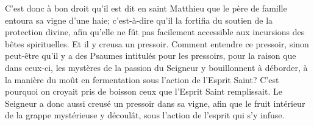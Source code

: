 C’est donc à bon droit qu’il est dit en saint Matthieu
	que le père de famille entoura sa vigne d’une haie;
	c’est-à-dire qu’il la fortifia du soutien de la protection divine,
	afin qu’elle ne fût pas facilement accessible
		aux incursions des bêtes spirituelles.
Et il y creusa un pressoir.
Comment entendre ce pressoir,
	sinon peut-être qu’il y a des Psaumes intitulés pour les pressoirs,
	pour la raison que dans ceux-ci,
	les mystères de la passion du Seigneur y bouillonnent à déborder,
	à la manière du moût en fermentation sous l’action de l’Esprit Saint?
C’est pourquoi on croyait pris de boisson ceux que l’Esprit Saint remplissait.
Le Seigneur a donc aussi creusé un pressoir dans sa vigne,
	afin que le fruit intérieur de la grappe mystérieuse y découlât,
	sous l’action de l’esprit qui s’y infuse.
